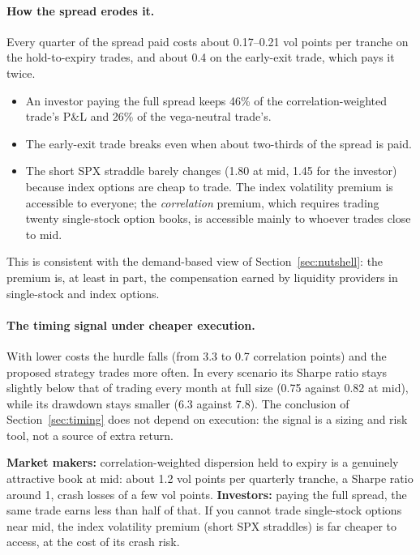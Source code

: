 \paragraph{How the spread erodes it.} Every quarter of the spread paid costs about 0.17--0.21 vol points per tranche on the hold-to-expiry trades, and about 0.4 on the early-exit trade, which pays it twice.
\begin{itemize}
  \item An investor paying the full spread keeps 46\% of the correlation-weighted trade's P\&L and 26\% of the vega-neutral trade's.
  \item The early-exit trade breaks even when about two-thirds of the spread is paid.
  \item The short SPX straddle barely changes (1.80 at mid, 1.45 for the investor) because index options are cheap to trade. The index volatility premium is accessible to everyone; the \emph{correlation} premium, which requires trading twenty single-stock option books, is accessible mainly to whoever trades close to mid.
\end{itemize}
This is consistent with the demand-based view of Section~\ref{sec:nutshell}: the premium is, at least in part, the compensation earned by liquidity providers in single-stock and index options.

\paragraph{The timing signal under cheaper execution.} With lower costs the hurdle falls (from 3.3 to 0.7 correlation points) and the proposed strategy trades more often. In every scenario its Sharpe ratio stays slightly below that of trading every month at full size (0.75 against 0.82 at mid), while its drawdown stays smaller (6.3 against 7.8). The conclusion of Section~\ref{sec:timing} does not depend on execution: the signal is a sizing and risk tool, not a source of extra return.

\begin{desk}
\textbf{Market makers:} correlation-weighted dispersion held to expiry is a genuinely attractive book at mid: about 1.2 vol points per quarterly tranche, a Sharpe ratio around 1, crash losses of a few vol points. \textbf{Investors:} paying the full spread, the same trade earns less than half of that. If you cannot trade single-stock options near mid, the index volatility premium (short SPX straddles) is far cheaper to access, at the cost of its crash risk.
\end{desk}


